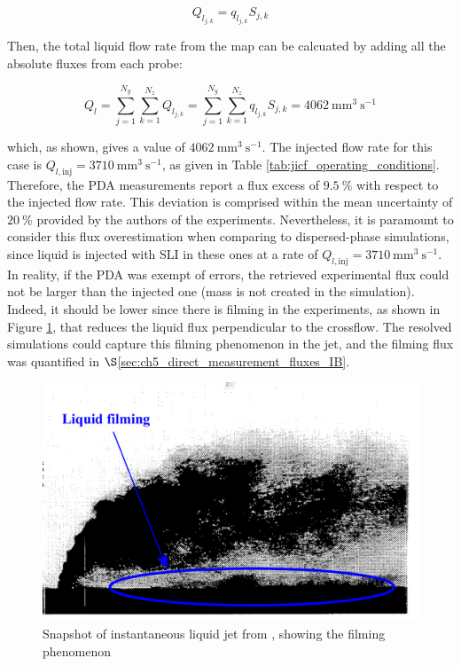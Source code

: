 \begin{equation}
Q_{l_{j,k}} = q_{l_{j,k}} S_{j,k}
\end{equation}

Then, the total liquid flow rate from the map can be calcuated by adding all the absolute fluxes from each probe:

\begin{equation}
\label{eq:ch6_Ql_total_estimation_from_flux_profiles}
Q_{l} = \sum_{j=1}^{N_y} \sum_{k=1}^{N_z} Q_{l_{j,k}} = \sum_{j=1}^{N_y} \sum_{k=1}^{N_z} q_{l_{j,k}} S_{j,k} = 4062 ~ \mathrm{mm}^3~\mathrm{s}^{-1}
\end{equation}

which, as shown, gives a value of $4062 ~ \mathrm{mm}^3~\mathrm{s}^{-1}$. The injected flow rate for this case is $Q_{l,\mathrm{inj}} = 3710~ \mathrm{mm}^3~\mathrm{s}^{-1}$, as given in Table \ref{tab:jicf_operating_conditions}. Therefore, the PDA measurements report a flux excess of $9.5~\%$ with respect to the injected flow rate. This deviation is comprised within the mean uncertainty of $20~\%$ provided by the authors of the experiments. Nevertheless, it is paramount to consider this flux overestimation when comparing to dispersed-phase simulations, since liquid is injected with SLI in these ones at a rate of  $Q_{l,\mathrm{inj}} = 3710~ \mathrm{mm}^3~\mathrm{s}^{-1}$. In reality, if the PDA was exempt of errors, the retrieved experimental flux could not be larger than the injected one (mass is not created in the simulation). Indeed, it should be lower since there is filming in the experiments, as shown in Figure \ref{fig:jicf_snapshot_expe_filming}, that reduces the liquid flux perpendicular to the crossflow. The resolved simulations could capture this filming phenomenon in the jet, and the filming flux was quantified in $\S$\ref{sec:ch5_direct_measurement_fluxes_IB}. 


\begin{figure}[h!]	
	\centering	
	\includegraphics[scale=0.4]{./part2_developments/figures_ch6_lagrangian_JICF/expe_results/snapshot_expe_filming}
	\caption{Snapshot of instantaneous liquid jet from , showing the filming phenomenon}
	\label{fig:jicf_snapshot_expe_filming}
\end{figure}




